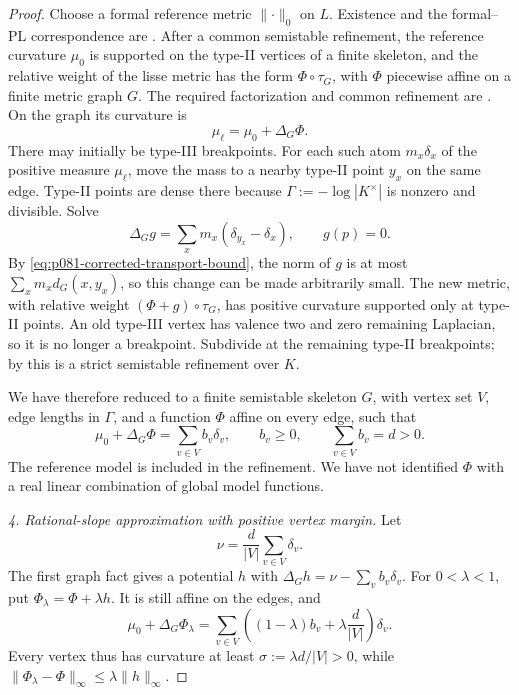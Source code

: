\begin{proof}
Choose a formal reference metric $\lVert\cdot\rVert_0$ on $L$.
Existence and the formal--PL correspondence are
\cite[\S2.2 and Proposition~2.10]{GM19}.  After a common semistable
refinement, the reference curvature $\mu_0$ is supported on the
type-II vertices of a finite skeleton, and the relative weight of the
lisse metric has the form $\Phi\circ\tau_G$, with $\Phi$ piecewise
affine on a finite metric graph $G$.  The required factorization and
common refinement are \cite[Proposition~3.2.4 and Lemma~2.2.22]{Thu05}.
On the graph its curvature is
\[
                    \mu_\ell=\mu_0+\Delta_G\Phi.
\]
There may initially be type-III breakpoints.  For each such atom
$m_x\delta_x$ of the positive measure $\mu_\ell$, move the mass to
a nearby type-II point $y_x$ on the same edge.  Type-II points are
dense there because $\Gamma:=-\log|K^\times|$ is nonzero and divisible.
Solve
\[
 \Delta_G g=\sum_xm_x(\delta_{y_x}-\delta_x),\qquad g(p)=0.
\]
By \eqref{eq:p081-corrected-transport-bound}, the norm of $g$ is at most
$\sum_xm_xd_G(x,y_x)$, so this change can be made arbitrarily small.
The new metric, with relative weight
$(\Phi+g)\circ\tau_G$, has positive curvature supported only at
type-II points.  An old type-III vertex has valence two and zero
remaining Laplacian, so it is no longer a breakpoint.  Subdivide at
the remaining type-II breakpoints; by \cite[Lemma~2.2.22]{Thu05} this is
a strict semistable refinement over $K$.

We have therefore reduced to a finite semistable skeleton $G$, with
vertex set $V$, edge lengths in $\Gamma$, and a function $\Phi$
affine on every edge, such that
\begin{equation}
\label{eq:p081-corrected-vertex-curvature}
 \mu_0+\Delta_G\Phi=\sum_{v\in V}b_v\delta_v,\qquad
 b_v\geq0,\qquad\sum_{v\in V}b_v=d>0.
\end{equation}
The reference model is included in the refinement.  We have not
identified $\Phi$ with a real linear combination of global model
functions.

\emph{4. Rational-slope approximation with positive vertex margin.}
Let
\[
        \nu=\frac{d}{|V|}\sum_{v\in V}\delta_v.
\]
The first graph fact gives a potential $h$ with
$\Delta_G h=\nu-\sum_v b_v\delta_v$.  For $0<\lambda<1$, put
$\Phi_\lambda=\Phi+\lambda h$.  It is still affine on the edges, and
\[
 \mu_0+\Delta_G\Phi_\lambda
   =\sum_{v\in V}\left((1-\lambda)b_v+
                         \lambda\frac{d}{|V|}\right)\delta_v.
\]
Every vertex thus has curvature at least
$\sigma:=\lambda d/|V|>0$, while
$\lVert\Phi_\lambda-\Phi\rVert_\infty
 \leq\lambda\lVert h\rVert_\infty$.


\end{proof}
